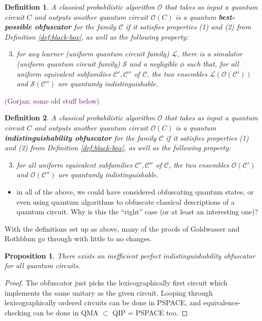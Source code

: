 \documentclass[11pt]{article}
\numberwithin{equation}{section}
\newtheorem{proposition}{Proposition}
\newtheorem{definition}{Definition}
\newcommand{\ga}[1]{{ \textcolor{purple}{(Gorjan:  #1)}}{}}
\begin{document}
{\begin{definition} A classical probabilistic algorithm $\mathcal O$ that takes as input a quantum circuit $C$ and outputs another quantum circuit $\mathcal O(C)$ is a quantum {\bf best-possible obfuscator} for the family $\mathcal C$ if it satisfies properties (1) and (2) from Definition \ref{def:black-box}, as well as the following property:
\begin{enumerate}
\setcounter{enumi}{2}
\item for any learner (uniform quantum circuit family) $\mathcal L$, there is a simulator (uniform quantum circuit family) $\mathcal S$ and a negligible $\phi$ such that, for all uniform equivalent subfamilies $\mathcal C', \mathcal C''$ of $\mathcal C$, the two ensembles $\mathcal L(\mathcal O(\mathcal C'))$ and $\mathcal S(\mathcal C'')$ are quantumly indistinguishable.
\end{enumerate}
\end{definition}


\ga{some old stuff below}

\begin{definition} A classical probabilistic algorithm $\mathcal O$ that takes as input a quantum circuit $C$ and outputs another quantum circuit $\mathcal O(C)$ is a quantum {\bf indistinguishability obfuscator} for the family $\mathcal C$ if it satisfies properties (1) and (2) from Definition \ref{def:black-box}, as well as the following property:
\begin{enumerate}
\setcounter{enumi}{2}
\item for all uniform equivalent subfamilies $\mathcal C', \mathcal C''$ of $\mathcal C$, the two ensembles $\mathcal O(\mathcal C')$ and $\mathcal O(\mathcal C'')$ are quantumly indistinguishable.
\end{enumerate}
\end{definition}

\begin{itemize}
\item in all of the above, we could have considered obfuscating quantum states, or even using quantum algorithms to obfuscate classical descriptions of a quantum circuit. Why is this the ``right'' case (or at least an interesting one)?
\end{itemize}

With the definitions set up as above, many of the proofs of Goldwasser and Rothblum go through with little to no changes.

\begin{proposition} There exists an inefficient perfect indistinguishability obfuscator for all quantum circuits.
\end{proposition}
\begin{proof}
The obfuscator just picks the lexicographically first circuit which implements the same unitary as the given circuit. Looping through lexicographically ordered circuits can be done in PSPACE, and equivalence-checking can be done in QMA $\subset$ QIP = PSPACE too.
\end{proof}

}
\end{document}
